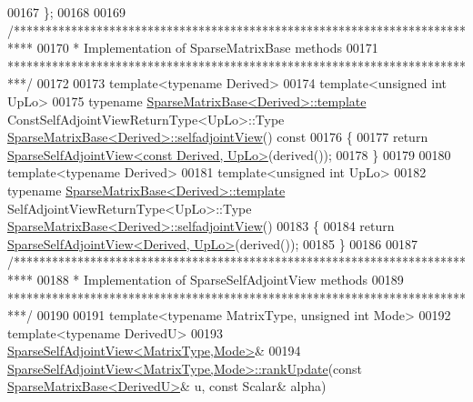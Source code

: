 \begin{DoxyCode}
00167 \};
00168 
00169 \textcolor{comment}{/***************************************************************************}
00170 \textcolor{comment}{* Implementation of SparseMatrixBase methods}
00171 \textcolor{comment}{***************************************************************************/}
00172 
00173 \textcolor{keyword}{template}<\textcolor{keyword}{typename} Derived>
00174 \textcolor{keyword}{template}<\textcolor{keywordtype}{unsigned} \textcolor{keywordtype}{int} UpLo>
00175 \textcolor{keyword}{typename} \hyperlink{group___sparse_core___module_class_eigen_1_1_sparse_matrix_base}{SparseMatrixBase<Derived>::template} 
      ConstSelfAdjointViewReturnType<UpLo>::Type \hyperlink{group___sparse_core___module_class_eigen_1_1_sparse_matrix_base}{SparseMatrixBase<Derived>::selfadjointView}()\textcolor{keyword}{ const}
00176 \textcolor{keyword}{}\{
00177   \textcolor{keywordflow}{return} \hyperlink{group___sparse_core___module_class_eigen_1_1_sparse_self_adjoint_view}{SparseSelfAdjointView<const Derived, UpLo>}(derived());
00178 \}
00179 
00180 \textcolor{keyword}{template}<\textcolor{keyword}{typename} Derived>
00181 \textcolor{keyword}{template}<\textcolor{keywordtype}{unsigned} \textcolor{keywordtype}{int} UpLo>
00182 \textcolor{keyword}{typename} \hyperlink{group___sparse_core___module_class_eigen_1_1_sparse_matrix_base}{SparseMatrixBase<Derived>::template} 
      SelfAdjointViewReturnType<UpLo>::Type \hyperlink{group___sparse_core___module_class_eigen_1_1_sparse_matrix_base}{SparseMatrixBase<Derived>::selfadjointView}()
00183 \{
00184   \textcolor{keywordflow}{return} \hyperlink{group___sparse_core___module_class_eigen_1_1_sparse_self_adjoint_view}{SparseSelfAdjointView<Derived, UpLo>}(derived());
00185 \}
00186 
00187 \textcolor{comment}{/***************************************************************************}
00188 \textcolor{comment}{* Implementation of SparseSelfAdjointView methods}
00189 \textcolor{comment}{***************************************************************************/}
00190 
00191 \textcolor{keyword}{template}<\textcolor{keyword}{typename} MatrixType, \textcolor{keywordtype}{unsigned} \textcolor{keywordtype}{int} Mode>
00192 \textcolor{keyword}{template}<\textcolor{keyword}{typename} DerivedU>
00193 \hyperlink{group___sparse_core___module_class_eigen_1_1_sparse_self_adjoint_view}{SparseSelfAdjointView<MatrixType,Mode>}&
00194 \hyperlink{group___sparse_core___module_abe66734215f8d8220be0985d67901021}{SparseSelfAdjointView<MatrixType,Mode>::rankUpdate}(\textcolor{keyword}{const} 
      \hyperlink{group___sparse_core___module_class_eigen_1_1_sparse_matrix_base}{SparseMatrixBase<DerivedU>}& u, \textcolor{keyword}{const} Scalar& alpha)

\end{DoxyCode}
